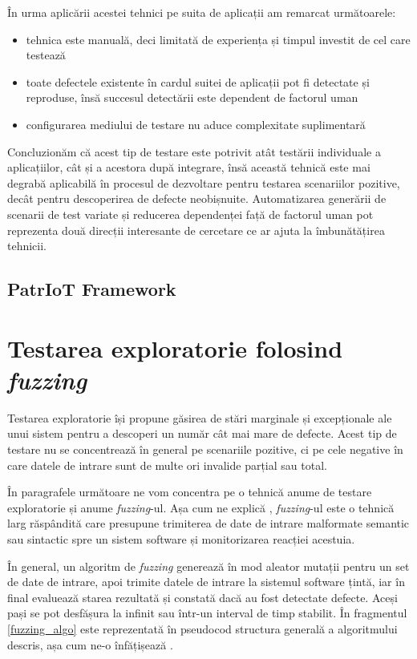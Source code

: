 În urma aplicării acestei tehnici pe suita de aplicații am remarcat următoarele:
\begin{itemize}
    \item tehnica este manuală, deci limitată de experiența și timpul investit de cel care testează
    \item toate defectele existente în cardul suitei de aplicații pot fi detectate și reproduse, însă succesul detectării este dependent de factorul uman
    \item configurarea mediului de testare nu aduce complexitate suplimentară
\end{itemize}

Concluzionăm că acest tip de testare este potrivit atât testării individuale a aplicațiilor, cât și a acestora după integrare, însă această tehnică este mai degrabă aplicabilă în procesul de dezvoltare pentru testarea scenariilor pozitive, decât pentru descoperirea de defecte neobișnuite. Automatizarea generării de scenarii de test variate și reducerea dependenței față de factorul uman pot reprezenta două direcții interesante de cercetare ce ar ajuta la îmbunătățirea tehnicii.

\subsection{PatrIoT Framework}


\section{Testarea exploratorie folosind \emph{fuzzing}}

Testarea exploratorie își propune găsirea de stări marginale și excepționale ale unui sistem pentru a descoperi un număr cât mai mare de defecte. Acest tip de testare nu se concentrează în general pe scenariile pozitive, ci pe cele negative în care datele de intrare sunt de multe ori invalide parțial sau total.

În paragrafele următoare ne vom concentra pe o tehnică anume de testare exploratorie și anume \textit{fuzzing}-ul. Așa cum ne explică \cite{Manes2021}, \textit{fuzzing}-ul este o tehnică larg răspândită care presupune trimiterea de date de intrare malformate semantic sau sintactic spre un sistem software și monitorizarea reacției acestuia. 

În general, un algoritm de \textit{fuzzing} generează în mod aleator mutații pentru un set de date de intrare, apoi trimite datele de intrare la sistemul software țintă, iar în final evaluează starea rezultată și constată dacă au fost detectate defecte. Aceși pași se pot desfășura la infinit sau într-un interval de timp stabilit. În fragmentul \ref{fuzzing_algo} este reprezentată în pseudocod structura generală a algoritmului descris, așa cum ne-o înfățișează \cite{Manes2021}.

